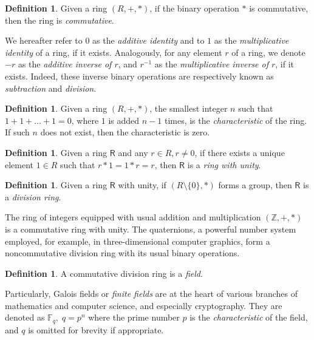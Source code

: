 \documentclass[12pt, a4paper, oneside]{memoir}
\theoremstyle{definition}
\newtheorem{definition}[theorem]{Definition}
\begin{document}
\begin{definition}
  Given a ring $(R, +, \ast)$, if the binary operation $\ast$ is commutative, then the ring is \emph{commutative}.
\end{definition}

We hereafter refer to $0$ as the \emph{additive identity} and to $1$ as the \emph{multiplicative identity} of a ring, if it exists. Analogously, for any element $r$ of a ring, we denote $-r$ as the \emph{additive inverse of $r$}, and $r^{-1}$ as the \emph{multiplicative inverse of $r$}, if it exists. Indeed, these inverse binary operations are respectively known as \emph{subtraction} and \emph{division}.

\begin{definition}
  Given a ring $(R, +, \ast)$, the smallest integer $n$ such that $1 + 1 + \dots + 1 = 0$, where $1$ is added $n - 1$ times, is the \emph{characteristic} of the ring. If such $n$ does not exist, then the characteristic is zero.
\end{definition}

\begin{definition}
  Given a ring $\mathsf{R}$ and any $r \in R, r \neq 0$, if there exists a unique element $1 \in R$ such that $r \ast 1 = 1 \ast r = r$, then $\mathsf{R}$ is a \emph{ring with unity}.
\end{definition}

\begin{definition}
  Given a ring $\mathsf{R}$ with unity, if $(R \setminus \{0\}, \ast)$ forms a group, then $\mathsf{R}$ is a \emph{division ring}.
\end{definition}

The ring of integers equipped with usual addition and multiplication $(\mathbb{Z}, +, \ast)$ is a commutative ring with unity. The quaternions, a powerful number system employed, for example, in three-dimensional computer graphics, form a noncommutative division ring with its usual binary operations.

\begin{definition}
  A commutative division ring is a \emph{field}.
\end{definition}

Particularly, Galois fields or \emph{finite fields} are at the heart of various branches of mathematics and computer science, and especially cryptography. They are denoted as $\mathbb{F}_{q},\; q = p^{n}$ where the prime number $p$ is the \emph{characteristic} of the field, and $q$ is omitted for brevity if appropriate.
\end{document}
